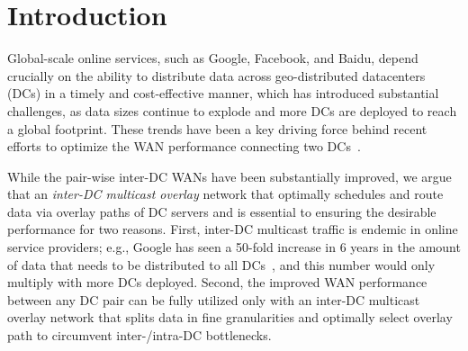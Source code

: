 \section{Introduction}

Global-scale online services, such as Google, Facebook, and Baidu,
depend crucially on the ability to distribute data across
geo-distributed datacenters (DCs) in a timely and cost-effective
manner, which has introduced substantial challenges, as data sizes
continue to explode and more DCs are deployed to reach a global
footprint.
These trends have been a key driving force behind recent efforts
to optimize the WAN performance connecting two
DCs~\cite{jain2013b4,kumar2015bwe,hong2013achieving,Zhang2015Guaranteeing,Savage1999The}.

While the pair-wise inter-DC WANs have been substantially improved,
we argue that an {\em inter-DC multicast
overlay} network that optimally schedules and route data via
overlay paths of DC servers and is essential to ensuring the
desirable performance for two reasons.
First, inter-DC multicast traffic is endemic in online service
providers; e.g.,
Google has seen a 50-fold increase in 6 years
in the amount of data that needs to be distributed to all
DCs~\cite{6627725}, and this number would only multiply with more
DCs deployed.
Second, the improved WAN performance between any DC pair can be
fully utilized only with an inter-DC multicast overlay network that
splits data in fine granularities and optimally select
overlay path to circumvent inter-/intra-DC bottlenecks.



